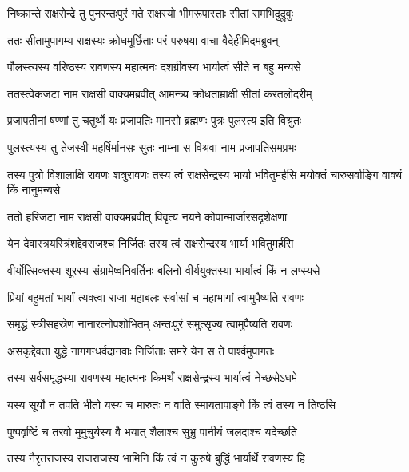 \twolineshloka
{निष्क्रान्ते राक्षसेन्द्रे तु पुनरन्तःपुरं गते}
{राक्षस्यो भीमरूपास्ताः सीतां समभिदुद्रुवुः} %

\twolineshloka
{ततः सीतामुपागम्य राक्षस्यः क्रोधमूर्छिताः}
{परं परुषया वाचा वैदेहीमिदमब्रुवन्} %

\twolineshloka
{पौलस्त्यस्य वरिष्ठस्य रावणस्य महात्मनः}
{दशग्रीवस्य भार्यात्वं सीते न बहु मन्यसे} %

\twolineshloka
{ततस्त्वेकजटा नाम राक्षसी वाक्यमब्रवीत्}
{आमन्त्र्य क्रोधताम्राक्षी सीतां करतलोदरीम्} %

\twolineshloka
{प्रजापतीनां षण्णां तु चतुर्थो यः प्रजापतिः}
{मानसो ब्रह्मणः पुत्रः पुलस्त्य इति विश्रुतः} %

\twolineshloka
{पुलस्त्यस्य तु तेजस्वी महर्षिर्मानसः सुतः}
{नाम्ना स विश्रवा नाम प्रजापतिसमप्रभः} %

\threelineshloka
{तस्य पुत्रो विशालाक्षि रावणः शत्रुरावणः}
{तस्य त्वं राक्षसेन्द्रस्य भार्या भवितुमर्हसि}
{मयोक्तं चारुसर्वाङ्गि वाक्यं किं नानुमन्यसे} %

\twolineshloka
{ततो हरिजटा नाम राक्षसी वाक्यमब्रवीत्}
{विवृत्य नयने कोपान्मार्जारसदृशेक्षणा} %

\twolineshloka
{येन देवास्त्रयस्त्रिंशद्देवराजश्च निर्जितः}
{तस्य त्वं राक्षसेन्द्रस्य भार्या भवितुमर्हसि} %

\twolineshloka
{वीर्योत्सिक्तस्य शूरस्य संग्रामेष्वनिवर्तिनः}
{बलिनो वीर्ययुक्तस्या भार्यात्वं किं न लप्स्यसे} %

\twolineshloka
{प्रियां बहुमतां भार्यां त्यक्त्वा राजा महाबलः}
{सर्वासां च महाभागां त्वामुपैष्यति रावणः} %

\twolineshloka
{समृद्धं स्त्रीसहस्रेण नानारत्नोपशोभितम्}
{अन्तःपुरं समुत्सृज्य त्वामुपैष्यति रावणः} %

\twolineshloka
{असकृद्देवता युद्धे नागगन्धर्वदानवाः}
{निर्जिताः समरे येन स ते पार्श्वमुपागतः} %

\twolineshloka
{तस्य सर्वसमृद्धस्या रावणस्य महात्मनः}
{किमर्थं राक्षसेन्द्रस्य भार्यात्वं नेच्छसेऽधमे} %

\twolineshloka
{यस्य सूर्यो न तपति भीतो यस्य च मारुतः}
{न वाति स्मायतापाङ्गे किं त्वं तस्य न तिष्ठसि} %

\twolineshloka
{पुष्पवृष्टिं च तरवो मुमुचुर्यस्य वै भयात्}
{शैलाश्च सुभ्रु पानीयं जलदाश्च यदेच्छति} %

\twolineshloka
{तस्य नैरृतराजस्य राजराजस्य भामिनि}
{किं त्वं न कुरुषे बुद्धिं भार्यार्थे रावणस्य हि} %

